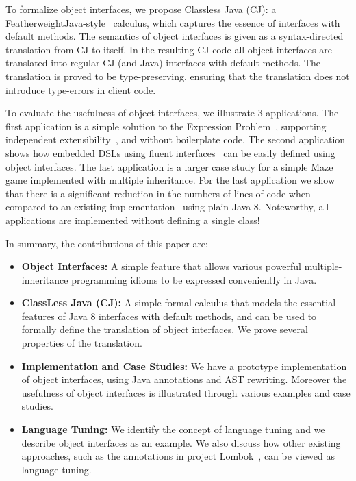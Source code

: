 To formalize object interfaces, we propose Classless Java (CJ): a
FeatherweightJava-style~\cite{Igarashi01FJ} calculus, which captures the essence
of interfaces with default methods. The semantics of object interfaces
is given as a syntax-directed translation from CJ to itself. In the
resulting CJ code all object interfaces are translated into regular CJ
(and Java) interfaces with default methods. The translation is proved
to be type-preserving, ensuring that the translation does not
introduce type-errors in client code. 

To evaluate the usefulness of object interfaces, we illustrate 3
applications. The first application is a simple 
solution to the Expression Problem~\cite{wadler98expression}, supporting independent 
extensibility~\cite{zenger05independentlyextensible}, and without boilerplate code. The second
application shows how embedded DSLs using fluent interfaces~\cite{fowler2005fluentinterface} 
can be easily defined using object interfaces. The last
application is a larger case study for a simple Maze game implemented with 
multiple inheritance. For the last application we show that there is a
significant reduction in the numbers of lines of code when compared 
to an existing implementation~\cite{bono14} using plain Java 8. 
Noteworthy, all applications are implemented 
without defining a single class!

In summary, the contributions of this paper are:
\begin{itemize}

\item {\bf Object Interfaces:} A simple feature that allows various
  powerful multiple-inheritance programming idioms to be expressed
  conveniently in Java.

\item {\bf ClassLess Java (CJ):} A simple formal calculus that models 
the essential features of Java 8 interfaces with default methods, and 
can be used to formally define the translation of object interfaces. 
We prove several properties of the translation.

\item {\bf Implementation and Case Studies:} We have a prototype
  implementation of object interfaces, using Java
  annotations and AST rewriting. Moreover the usefulness of object interfaces is
  illustrated through various examples and case studies.

\item{\bf Language Tuning:} We identify the concept of language tuning 
and we describe object interfaces as an example. We also discuss 
how other existing approaches, such as the annotations in project 
Lombok~\cite{lombok},  can be viewed as language tuning.

\end{itemize}
